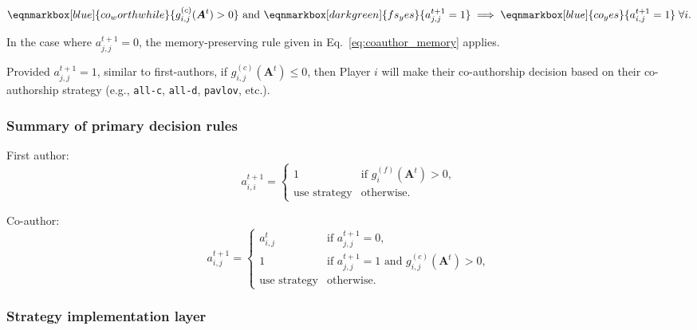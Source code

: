 \documentclass[12pt]{article}
\begin{document}
\vspace{2em}
\begin{equation}
    \eqnmarkbox[blue]{co_worthwhile}{g_{i,j}^{(c)}(\boldsymbol{A}^{t}) > 0}
    \text{ and } \eqnmarkbox[darkgreen]{fs_yes}{a_{j, j}^{t+1} = 1} \implies \eqnmarkbox[blue]{co_yes}{a_{i, j}^{t+1} = 1}
    \; \forall i.
\end{equation}

In the case where $a_{j, j}^{t+1} = 0$,
the memory-preserving rule given in Eq.~\ref{eq:coauthor_memory} applies.

Provided $a_{j, j}^{t+1} = 1$,
similar to first-authors,
if $g_{i, j}^{(c)}(\boldsymbol{A}^{t}) \leq 0$,
then Player $i$ will make their co-authorship decision based on their co-authorship strategy (e.g., {\tt all-c}, {\tt all-d}, {\tt pavlov}, etc.).

\subsubsection{Summary of primary decision rules}

First author:
\begin{equation}
    a_{i,i}^{t+1} = 
    \begin{cases}
        1 & \text{if } g_i^{(f)}(\boldsymbol{A}^{t}) > 0, \\
        \text{use strategy} & \text{otherwise}.
    \end{cases}
\end{equation}

Co-author:
\begin{equation}
    a_{i,j}^{t+1} = 
    \begin{cases}
        a_{i,j}^t & \text{if } a_{j,j}^{t+1} = 0, \\
        1 & \text{if } a_{j,j}^{t+1} = 1 \text{ and } 
             g_{i,j}^{(c)}(\boldsymbol{A}^{t}) > 0,  \\
        \text{use strategy} & \text{otherwise}.
    \end{cases}
\end{equation}

\subsubsection{Strategy implementation layer}
\end{document}
